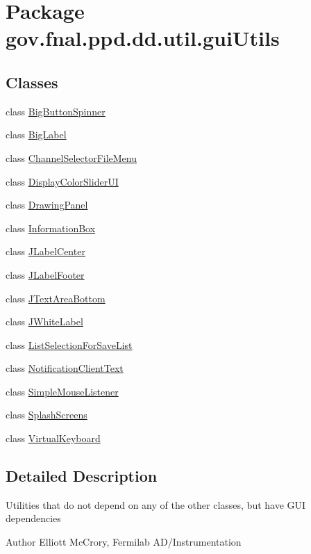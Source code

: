 \hypertarget{namespacegov_1_1fnal_1_1ppd_1_1dd_1_1util_1_1guiUtils}{\section{Package gov.\-fnal.\-ppd.\-dd.\-util.\-gui\-Utils}
\label{namespacegov_1_1fnal_1_1ppd_1_1dd_1_1util_1_1guiUtils}
}
\subsection*{Classes}
\begin{DoxyCompactItemize}
\item 
class \hyperlink{classgov_1_1fnal_1_1ppd_1_1dd_1_1util_1_1guiUtils_1_1BigButtonSpinner}{Big\-Button\-Spinner}
\item 
class \hyperlink{classgov_1_1fnal_1_1ppd_1_1dd_1_1util_1_1guiUtils_1_1BigLabel}{Big\-Label}
\item 
class \hyperlink{classgov_1_1fnal_1_1ppd_1_1dd_1_1util_1_1guiUtils_1_1ChannelSelectorFileMenu}{Channel\-Selector\-File\-Menu}
\item 
class \hyperlink{classgov_1_1fnal_1_1ppd_1_1dd_1_1util_1_1guiUtils_1_1DisplayColorSliderUI}{Display\-Color\-Slider\-U\-I}
\item 
class \hyperlink{classgov_1_1fnal_1_1ppd_1_1dd_1_1util_1_1guiUtils_1_1DrawingPanel}{Drawing\-Panel}
\item 
class \hyperlink{classgov_1_1fnal_1_1ppd_1_1dd_1_1util_1_1guiUtils_1_1InformationBox}{Information\-Box}
\item 
class \hyperlink{classgov_1_1fnal_1_1ppd_1_1dd_1_1util_1_1guiUtils_1_1JLabelCenter}{J\-Label\-Center}
\item 
class \hyperlink{classgov_1_1fnal_1_1ppd_1_1dd_1_1util_1_1guiUtils_1_1JLabelFooter}{J\-Label\-Footer}
\item 
class \hyperlink{classgov_1_1fnal_1_1ppd_1_1dd_1_1util_1_1guiUtils_1_1JTextAreaBottom}{J\-Text\-Area\-Bottom}
\item 
class \hyperlink{classgov_1_1fnal_1_1ppd_1_1dd_1_1util_1_1guiUtils_1_1JWhiteLabel}{J\-White\-Label}
\item 
class \hyperlink{classgov_1_1fnal_1_1ppd_1_1dd_1_1util_1_1guiUtils_1_1ListSelectionForSaveList}{List\-Selection\-For\-Save\-List}
\item 
class \hyperlink{classgov_1_1fnal_1_1ppd_1_1dd_1_1util_1_1guiUtils_1_1NotificationClientText}{Notification\-Client\-Text}
\item 
class \hyperlink{classgov_1_1fnal_1_1ppd_1_1dd_1_1util_1_1guiUtils_1_1SimpleMouseListener}{Simple\-Mouse\-Listener}
\item 
class \hyperlink{classgov_1_1fnal_1_1ppd_1_1dd_1_1util_1_1guiUtils_1_1SplashScreens}{Splash\-Screens}
\item 
class \hyperlink{classgov_1_1fnal_1_1ppd_1_1dd_1_1util_1_1guiUtils_1_1VirtualKeyboard}{Virtual\-Keyboard}
\end{DoxyCompactItemize}


\subsection{Detailed Description}
Utilities that do not depend on any of the other classes, but have G\-U\-I dependencies

\begin{DoxyAuthor}{Author}
Elliott Mc\-Crory, Fermilab A\-D/\-Instrumentation 
\end{DoxyAuthor}
